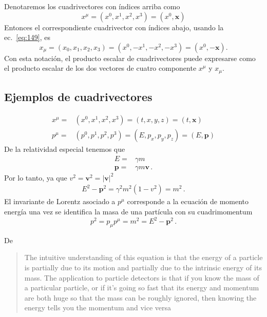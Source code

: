 \begin{frame}
Denotaremos los cuadrivectores con índices arriba como
\begin{equation}
  \label{eq:upindx}
  x^\mu=(x^0,x^1,x^2,x^3)=(x^0,\mathbf{x})
\end{equation}
Entonces el correspondiente cuadrivector con índices abajo, usando la ec.~\eqref{eq:149}, es
\begin{equation}
  x_\mu=(x_0,x_1,x_2,x_3)=(x^0,-x^1,-x^2,-x^3)=(x^0,-\mathbf{x}).
\end{equation}
Con esta notación, el producto escalar de cuadrivectores puede expresarse como el producto escalar de los dos vectores de cuatro componente $x^\mu$ y $x_\mu$.
\subsection{Ejemplos de cuadrivectores}
\begin{align}
    x^\mu=&(x^0,x^1,x^2,x^3)=(t,x,y,z)=(t,\mathbf{x})\\
  p^\mu=&(p^0,p^1,p^2,p^3)=(E,p_x,p_y,p_z)=(E,\mathbf{p})
\end{align}
De la relatividad especial tenemos que
\begin{align}
  E=&\gamma m \nonumber\\
  \mathbf{p}=&\gamma m\mathbf{v}\,.
\end{align}
Por lo tanto, ya que $v^2=\mathbf{v}^2=|\mathbf{v}|^2$
\begin{align}
  E^2-\mathbf{p}^2=\gamma^2m^2(1-v^2)=m^2\,.
\end{align}
El invariante de Lorentz asociado a $p^\mu$ corresponde a la ecuación de momento energía una vez se identifica la masa de una partícula con su cuadrimomentum
\begin{equation}
  p^2=p_\mu p^\mu=m^2=E^2-\mathbf{p}^2\,.
\end{equation}
\end{frame}
De \cite{uslhcblog}
\begin{quote}
  The intuitive understanding of this equation is that the energy of a particle is partially due to its motion and partially due to the intrinsic energy of its mass.  The application to particle detectors is that if you know the mass of a particular particle, or if it’s going so fast that its energy and momentum are both huge so that the mass can be roughly ignored, then knowing the energy tells you the momentum and vice versa
\end{quote}

